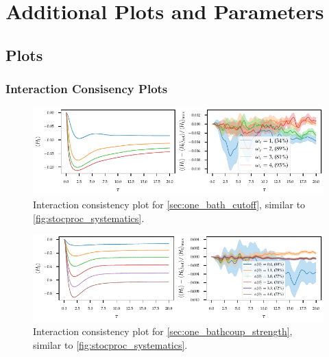 \chapter{Additional Plots and Parameters\label{chap:plus_plots_params}}

\section{Plots}
\label{sec:plus_plots}

\subsection{Interaction Consisency Plots}
\label{sec:intercons}
\begin{figure}[h]
  \centering
  \includegraphics{figs/one_bath_syst/omega_interaction_consistency}
  \caption{\label{fig:omega_interaction_consistency}Interaction
    consistency plot for \cref{sec:one_bath_cutoff}, similar to
    \cref{fig:stocproc_systematics}.}
\end{figure}
\begin{figure}[h]
  \centering
  \includegraphics{figs/one_bath_syst/delta_interaction_consistency}
  \caption{\label{fig:delta_interaction_consistency}Interaction
    consistency plot for \cref{sec:one_bathcoup_strength}, similar to
    \cref{fig:stocproc_systematics}.}
\end{figure}

